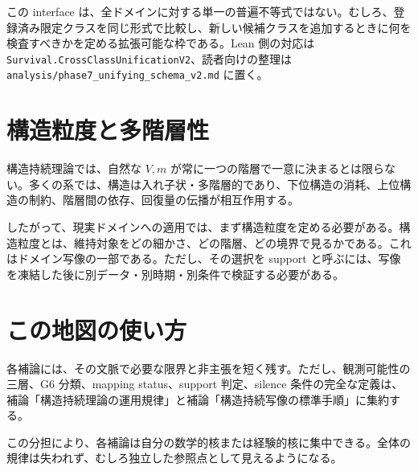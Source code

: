 \documentclass[12pt,a4paper]{article}
\begin{document}
この interface は、全ドメインに対する単一の普遍不等式ではない。むしろ、登録済み限定クラスを同じ形式で比較し、新しい候補クラスを追加するときに何を検査すべきかを定める拡張可能な枠である。Lean 側の対応は \texttt{Survival.CrossClassUnificationV2}、読者向けの整理は \texttt{analysis/phase7\_unifying\_schema\_v2.md} に置く。

\section{構造粒度と多階層性}\label{ux69cbux9020ux7c92ux5ea6ux3068ux591aux968eux5c64ux6027}

構造持続理論では、自然な \(V,m\) が常に一つの階層で一意に決まるとは限らない。多くの系では、構造は入れ子状・多階層的であり、下位構造の消耗、上位構造の制約、階層間の依存、回復量の伝播が相互作用する。

したがって、現実ドメインへの適用では、まず構造粒度を定める必要がある。構造粒度とは、維持対象をどの細かさ、どの階層、どの境界で見るかである。これはドメイン写像の一部である。ただし、その選択を support と呼ぶには、写像を凍結した後に別データ・別時期・別条件で検証する必要がある。

\section{この地図の使い方}\label{ux3053ux306eux5730ux56f3ux306eux4f7fux3044ux65b9}

各補論には、その文脈で必要な限界と非主張を短く残す。ただし、観測可能性の三層、G6 分類、mapping status、support 判定、silence 条件の完全な定義は、補論「構造持続理論の運用規律」と補論「構造持続写像の標準手順」に集約する。

この分担により、各補論は自分の数学的核または経験的核に集中できる。全体の規律は失われず、むしろ独立した参照点として見えるようになる。
\end{document}
